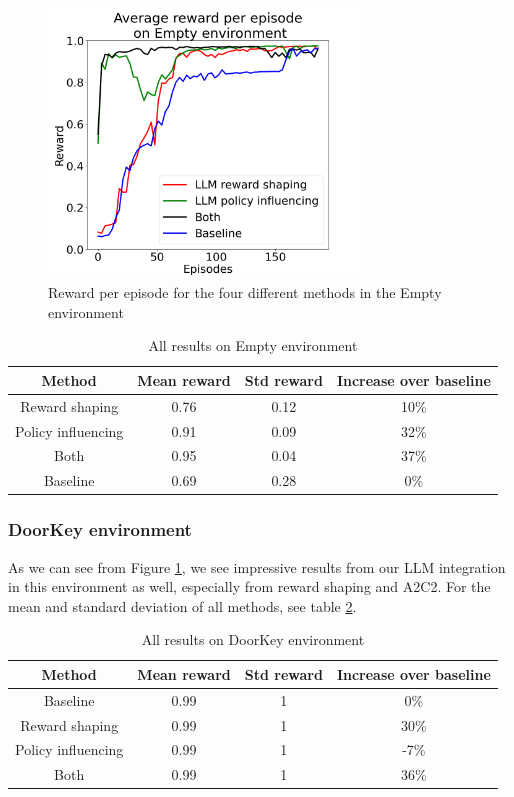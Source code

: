 \documentclass[conference]{IEEEtran}
\begin{document}
\begin{figure}[h]
\centerline{\includegraphics[width=3.25in]{figure/emptyresults.png}}
\caption{Reward per episode for the four different methods in the Empty environment}
\label{doorkeyresults}
\end{figure}

\begin{table}[h]
\caption{All results on Empty environment}
\begin{center}
\label{emptytable}
\begin{tabular}{c | c c c}
Method & Mean reward & Std reward & Increase over baseline \\
\hline
Reward shaping & 0.76 & 0.12 & 10\% \\
Policy influencing & 0.91 & 0.09 & 32\% \\
Both & 0.95 & 0.04 & 37\% \\
Baseline & 0.69 & 0.28 & 0\% \\
\end{tabular}
\end{center}
\end{table}


\subsubsection{DoorKey environment}

As we can see from Figure \ref{doorkeyresults}, we see impressive results from our LLM integration in this environment as well, especially from reward shaping and A2C2. For the mean and standard deviation of all methods, see table \ref{doorkeytable}.

\begin{table}[h]
\caption{All results on DoorKey environment}
\begin{center}
\label{doorkeytable}
\begin{tabular}{c | c c c}
Method & Mean reward & Std reward & Increase over baseline \\
\hline
Baseline & 0.99 & 1 & 0\% \\
Reward shaping & 0.99 & 1 & 30\% \\
Policy influencing & 0.99 & 1 & -7\% \\
Both & 0.99 & 1 & 36\% \\
\end{tabular}
\end{center}
\end{table}
\end{document}
